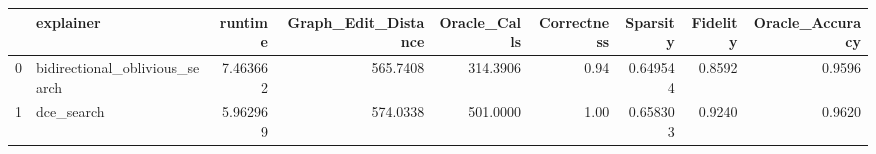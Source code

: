 \begin{tabular}{llrrrrrrr}
\toprule
{} &                       explainer &   runtime &  Graph\_Edit\_Distance &  Oracle\_Calls &  Correctness &  Sparsity &  Fidelity &  Oracle\_Accuracy \\
\midrule
0 &  bidirectional\_oblivious\_search &  7.463662 &             565.7408 &      314.3906 &         0.94 &  0.649544 &    0.8592 &           0.9596 \\
1 &                      dce\_search &  5.962969 &             574.0338 &      501.0000 &         1.00 &  0.658303 &    0.9240 &           0.9620 \\
\bottomrule
\end{tabular}
